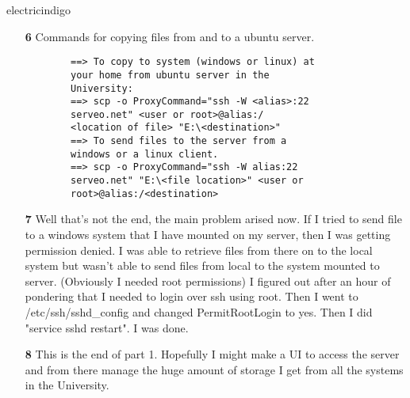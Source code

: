 \documentclass[12pt]{article}
\begin{document}
\begin{mybox}{electricindigo}{}
	\begin{itemize}
		\item[\textbf{6}] Commands for copying files from and to a ubuntu server.
		\begin{lstlisting}
		==> To copy to system (windows or linux) at 
		your home from ubuntu server in the 
		University:
		==> scp -o ProxyCommand="ssh -W <alias>:22 
		serveo.net" <user or root>@alias:/
		<location of file> "E:\<destination>"
		==> To send files to the server from a 
		windows or a linux client.
		==> scp -o ProxyCommand="ssh -W alias:22 
		serveo.net" "E:\<file location>" <user or 
		root>@alias:/<destination>
		\end{lstlisting}
	\item[\textbf{7}] Well that's not the end, the main problem arised now. If I tried to send file to a windows system that I have mounted on my server, then I was getting permission denied. I was able to retrieve files from there on to the local system but wasn't able to send files from local to the system mounted to server. (Obviously I needed root permissions) I figured out after an hour of pondering that I needed to login over ssh using root. Then I went to /etc/ssh/sshd\_config and changed PermitRootLogin to yes. Then I did "service sshd restart". I  was done. 
	\item[\textbf{8}] This is the end of part 1. Hopefully I might make a UI to access the server and from there manage the huge amount of storage I get from all the systems in the University.  
	\end{itemize}
\end{mybox}
		
\end{document}
